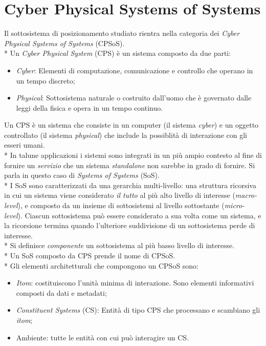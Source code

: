 \section{Cyber Physical Systems of Systems}
Il sottosistema di posizionamento studiato rientra nella categoria dei \emph{Cyber Physical Systems of Systems} (CPSoS). \cite{cecca}\\*
Un \emph{Cyber Physical System} (CPS) \`e un sistema composto da due parti:
\begin{itemize}
	\item \emph{Cyber}: Elementi di computazione, comunicazione e controllo che operano in un tempo discreto;
	\item \emph{Physical}: Sottosistema naturale o costruito dall'uomo che \`e governato dalle leggi della fisica e opera in un tempo continuo.
\end{itemize}
Un CPS \`e un sistema che consiste in un computer (il sistema \emph{cyber}) e un oggetto controllato (il sistema \emph{physical}) che include la possiblit\`a di interazione con gli esseri umani.\\*
In talune applicazioni i sistemi sono integrati in un pi\`u ampio contesto al fine di fornire un \emph{servizio} che un sistema \emph{standalone} non sarebbe in grado di fornire. Si parla in questo caso di \emph{Systems of Systems} (SoS).\\*
I SoS sono caratterizzati da una gerarchia multi-livello: una struttura ricorsiva in cui un sistema viene considerato \emph{il tutto} al pi\`u alto livello di interesse (\emph{macro-level}), e composto da un insieme di sottosistemi al livello sottostante (\emph{micro-level}). Ciascun sottosistema pu\`o essere considerato a sua volta come un sistema, e la ricorsione termina quando l'ulteriore suddivisione di un sottosistema perde di interesse.\\*
Si definisce \emph{componente} un sottosistema al pi\`u basso livello di interesse.\\*
Un SoS composto da CPS prende il nome di CPSoS.\\*
Gli elementi architetturali che compongono un CPSoS sono:
\begin{itemize}
	\item \emph{Itom}: costituiscono l'unit\`a minima di interazione. Sono elementi informativi composti da dati e metadati;
	\item \emph{Constituent Systems} (CS): Entit\`a di tipo CPS che processano e scambiano gli \emph{itom};
	\item Ambiente: tutte le entit\`a con cui pu\`o interagire un CS.
\end{itemize}
